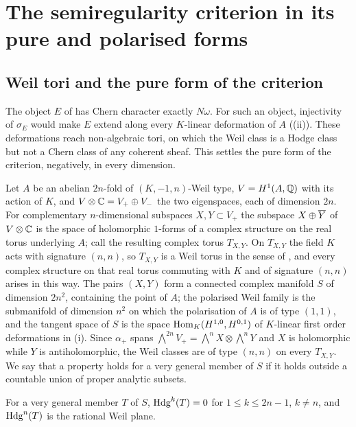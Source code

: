 \section{The semiregularity criterion in its pure and polarised forms}\label{sec:polarised}

\subsection{Weil tori and the pure form of the criterion}

The object $E$ of  has Chern character exactly
$N\omega$. For such an object, injectivity of $\sigma_{E}$ would make $E$
extend along every $K$-linear deformation of $A$ ((ii)). These
deformations reach non-algebraic tori, on which the Weil class is a Hodge
class but not a Chern class of any coherent sheaf. This settles the pure form
of the criterion, negatively, in every dimension.

\begin{setupenv}\label{setup:weiltori}
Let $A$ be an abelian $2n$-fold of $(K,-1,n)$-Weil type, $V=H^{1}(A,\mathbb{Q})$ with
its action of $K$, and $V\otimes\mathbb{C}=V_{+}\oplus V_{-}$ the two eigenspaces,
each of dimension $2n$. For complementary $n$-dimensional subspaces
$X,Y\subset V_{+}$ the subspace $X\oplus\overline{Y}$ of $V\otimes\mathbb{C}$ is the
space of holomorphic $1$-forms of a complex structure on the real torus
underlying $A$; call the resulting complex torus $T_{X,Y}$. On $T_{X,Y}$ the
field $K$ acts with signature $(n,n)$, so $T_{X,Y}$ is a Weil torus in the
sense of \cite{Voi02b}, and every complex structure on that real torus
commuting with $K$ and of signature $(n,n)$ arises in this way. The pairs
$(X,Y)$ form a connected complex manifold $S$ of dimension $2n^{2}$,
containing the point of $A$; the polarised Weil family is the submanifold of
dimension $n^{2}$ on which the polarisation of $A$ is of type $(1,1)$, and the
tangent space of $S$ is the space $\operatorname{Hom}_{K}(H^{1,0},H^{0,1})$ of $K$-linear
first order deformations in (i). Since
$\alpha_{+}$ spans $\bigwedge^{2n}V_{+}=\bigwedge^{n}X\otimes\bigwedge^{n}Y$
and $X$ is holomorphic while $Y$ is antiholomorphic, the Weil classes are of
type $(n,n)$ on every $T_{X,Y}$. We say that a property holds for a very
general member of $S$ if it holds outside a countable union of proper
analytic subsets.
\end{setupenv}

\begin{lemma}
\label{lem:weiltorushodge}
For a very general member $T$ of $S$, $\mathrm{Hdg}^{k}(T)=0$ for
$1\le k\le2n-1$, $k\ne n$, and $\mathrm{Hdg}^{n}(T)$ is the rational Weil plane.
\end{lemma}

